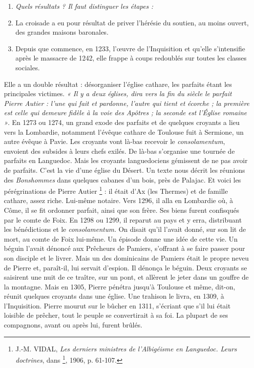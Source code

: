 \documentclass[french,twoside]{book} %
\newlength{\listmod}
\newcommand{\listhead}[1]{\hspace{-1\listmod}\emph{#1}}
\begin{document}
\label{p108}
\begin{enumerate}[itemsep=0pt,]
\item[]\listhead{Quels résultats ? Il faut distinguer les étapes :}
\item La croisade a eu pour résultat de priver l’hérésie du soutien, au moins ouvert, des grandes maisons baronales.
\item Depuis que commence, en 1233, l’œuvre de l’Inquisition et qu’elle s’intensifie après le massacre de 1242, elle frappe à coups redoublés sur toutes les classes sociales.

\end{enumerate}\noindent Elle a un double résultat : désorganiser l’église cathare, les parfaits étant les principales victimes. \emph{« Il y a deux églises, dira vers la fin du siècle le parfait Pierre Autier : l’une qui fait et pardonne, l’autre qui tient et écorche ; la première est celle qui demeure fidèle à la voie des Apôtres ; la seconde est l’Église romaine »}. En 1273 ou 1274, un grand exode des parfaits et de quelques croyants a lieu vers la Lombardie, notamment l’évêque cathare de Toulouse fuit à Sermione, un autre évêque à Pavie. Les croyants vont là-bas recevoir le {\itshape consolamentum}, envoient des subsides à leurs chefs exilés. De là-bas s’organise une tournée de parfaits en Languedoc. Mais les croyants languedociens gémissent de ne pas avoir de parfaits. C’est la vie d’une église du Désert. Un texte nous décrit les réunions des {\itshape Bonshommes} dans quelques cabanes d’un bois, près de Palajac. Et voici les pérégrinations de Pierre Autier \footnote{ J.-M. VIDAL, {\itshape Les derniers ministres de l’Albigéisme en Languedoc. Leurs doctrines}, dans \href{http://gallica.bnf.fr/document?O=N016999}{}\footnote{\href{http://gallica.bnf.fr/document?O=N016999}{http://gallica.bnf.fr/document?O=N016999}}, 1906, p. 61-107.} : il était d’Ax (les Thermes) et de famille cathare, assez riche. Lui-même notaire. Vers 1296, il alla en Lombardie où, à Côme, il se fit ordonner parfait, ainsi que son frère. Ses biens furent confisqués par le comte de Foix. En 1298 ou 1299, il reparut au pays et y erra, distribuant les bénédictions et le {\itshape consolamentum.} On disait qu’il l’avait donné, sur son lit de mort, au comte de Foix lui-même. Un épisode donne une idée de cette vie. Un béguin l’avait dénoncé aux Prêcheurs de Pamiers, s’offrant à se faire passer pour son disciple et le livrer. Mais un des dominicains de Pamiers était le propre neveu de Pierre et, paraît-il, lui servait d’espion. Il dénonça le béguin. Deux croyants se saisirent une nuit de ce traître, sur un pont, et allèrent le jeter dans un gouffre de la montagne. Mais en 1305, Pierre pénétra jusqu’à Toulouse et même, dit-on, réunit quelques croyants dans une église. Une trahison le livra, en 1309, à l’Inquisition. Pierre mourut sur le bûcher en 1311, s’écriant que s’il lui était loisible de prêcher, tout le peuple se convertirait à sa foi. La plupart de ses compagnons, avant ou après lui, furent brûlés.\par
\end{document}
